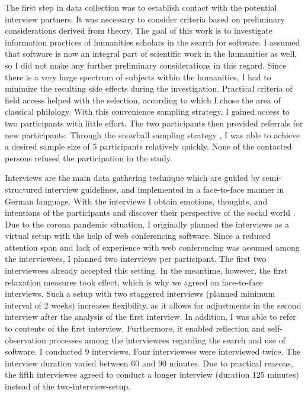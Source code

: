 \documentclass[12pt, a4paper, titlepage, oneside, abstract=true, toc=listof, toc=bibliography]{scrreprt}
\begin{document}
The first step in data collection was to establish contact with the potential interview partners. It was necessary to consider criteria based on preliminary considerations derived from theory. The goal of this work is to investigate information practices of humanities scholars in the search for software. I assumed that software is now an integral part of scientific work in the humanities as well, so I did not make any further preliminary considerations in this regard. Since there is a very large spectrum of subjects within the humanities, I had to minimize the resulting side effects during the investigation. Practical criteria of field access helped with the selection, according to which I chose the area of classical philology. With this convenience sampling strategy, I gained access to two participants with little effort. The two participants then provided referrals for new participants. Through the snowball sampling strategy \citep{Biernacki1981}, I was able to achieve a desired sample size of 5 participants relatively quickly. None of the contacted persons refused the participation in the study.

Interviews are the main data gathering technique which are guided by semi-structured interview guidelines, and implemented in a face-to-face manner \citep{Bryman2004} in German language. With the interviews I obtain emotions, thoughts, and intentions of the participants and discover their perspective of the social world \citep{Patton2002}. Due to the corona pandemic situation, I originally planned the interviews as a virtual setup with the help of web conferencing software. Since a reduced attention span and lack of experience with web conferencing was assumed among the interviewees, I planned two interviews per participant. The first two interviewees already accepted this setting. In the meantime, however, the first relaxation measures took effect, which is why we agreed on face-to-face interviews. Such a setup with two staggered interviews (planned minimum interval of 2 weeks) increases flexibility, as it allows for adjustments in the second interview after the analysis of the first interview. In addition, I was able to refer to contents of the first interview. Furthermore, it enabled reflection and self-observation processes among the interviewees regarding the search and use of software. I conducted 9 interviews. Four interviewees were interviewed twice. The interview duration varied between 60 and 90 minutes. Due to practical reasons, the fifth interviewee agreed to conduct a longer interview (duration 125 minutes) instead of the two-interview-setup.
\end{document}
